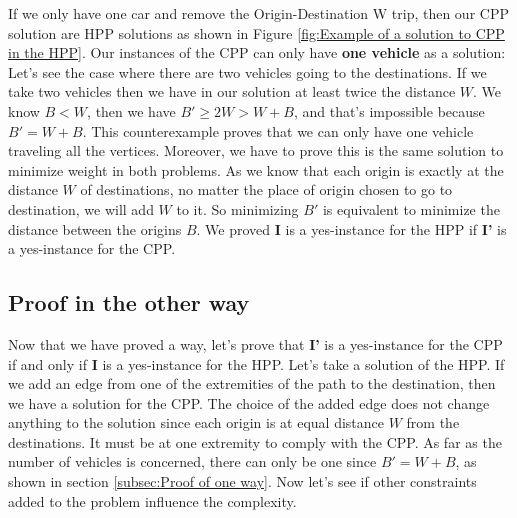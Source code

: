 \documentclass[12pt, a4paper, twoside]{memoir}
\newcommand{\newpar}{\vskip 0.2in \noindent}
\begin{document}
{	If we only have one car and remove the Origin-Destination W trip, then our CPP solution are HPP solutions as shown in Figure \ref{fig:Example of a solution to CPP in the HPP}.
	\newpar
	Our instances of the CPP can only have \textbf{one vehicle} as a solution:\newline
	Let's see the case where there are two vehicles going to the destinations.\newline
	If we take two vehicles then we have in our solution at least twice the distance $W$.\newline
	We know $B<W$, then we have $B'\ge 2W>W+B$, and that's impossible because $B'=W+B$. \newline
	This counterexample proves that we can only have one vehicle traveling all the vertices.
	\newpar
	Moreover, we have to prove this is the same solution to minimize weight in both problems.\newline
	As we know that each origin is exactly at the distance $W$ of destinations, no matter the place of origin chosen to go to destination, we will add $W$ to it.\newline
	So minimizing $B'$ is equivalent to minimize the distance between the origins $B$.\newline
	We proved \textbf{I} is a yes-instance for the HPP if \textbf{I'} is a yes-instance for the CPP.
	
	\subsection{Proof in the other way}
	
	Now that we have proved a way, let's prove that \textbf{I'} is a yes-instance for the CPP if and only if \textbf{I} is a yes-instance for the HPP.\newline
	Let's take a solution of the HPP. If we add an edge from one of the extremities of the path to the destination, then we have a solution for the CPP. \newline
	The choice of the added edge does not change anything to the solution since each origin is at equal distance $W$ from the destinations. It must be at one extremity to comply with the CPP. \newline
	As far as the number of vehicles is concerned, there can only be one since $B'=W+B$, as shown  in section \ref{subsec:Proof of one way}.
	\newpar
	Now let's see if other constraints added to the problem influence the complexity.
	
}
\end{document}
